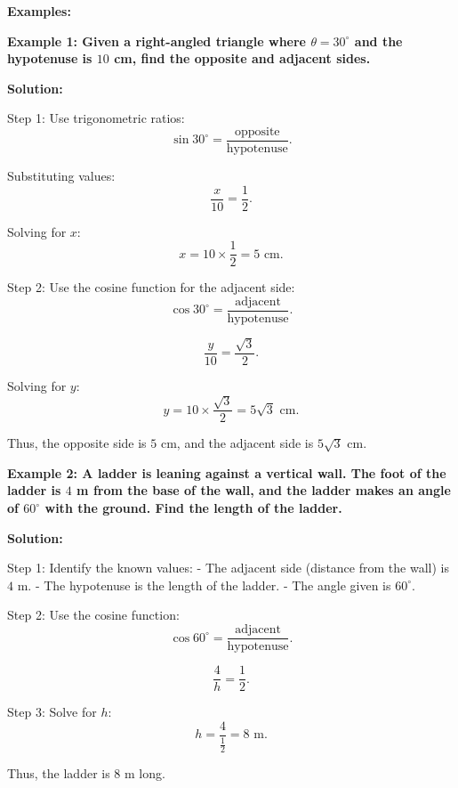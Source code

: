 \textbf{Examples:}

\begin{flushleft}
	\textbf{Example 1: Given a right-angled triangle where $\theta = 30^\circ$ and the hypotenuse is $10$ cm, find the opposite and adjacent sides.}
	
	\vspace{0.5cm}
	\textbf{Solution:}
	\vspace{0.5cm}
	
	Step 1: Use trigonometric ratios:
	\[
	\sin 30^\circ = \frac{\text{opposite}}{\text{hypotenuse}}.
	\]
	
	Substituting values:
	\[
	\frac{x}{10} = \frac{1}{2}.
	\]
	
	Solving for $x$:
	\[
	x = 10 \times \frac{1}{2} = 5 \text{ cm}.
	\]
	
	Step 2: Use the cosine function for the adjacent side:
	\[
	\cos 30^\circ = \frac{\text{adjacent}}{\text{hypotenuse}}.
	\]
	
	\[
	\frac{y}{10} = \frac{\sqrt{3}}{2}.
	\]
	
	Solving for $y$:
	\[
	y = 10 \times \frac{\sqrt{3}}{2} = 5\sqrt{3} \text{ cm}.
	\]
	
	Thus, the opposite side is $5$ cm, and the adjacent side is $5\sqrt{3}$ cm.
\end{flushleft}

\begin{flushleft}
	\textbf{Example 2: A ladder is leaning against a vertical wall. The foot of the ladder is $4$ m from the base of the wall, and the ladder makes an angle of $60^\circ$ with the ground. Find the length of the ladder.}
	
	\vspace{0.5cm}
	\textbf{Solution:}
	\vspace{0.5cm}
	
	Step 1: Identify the known values:
	- The adjacent side (distance from the wall) is $4$ m.
	- The hypotenuse is the length of the ladder.
	- The angle given is $60^\circ$.
	
	Step 2: Use the cosine function:
	\[
	\cos 60^\circ = \frac{\text{adjacent}}{\text{hypotenuse}}.
	\]
	
	\[
	\frac{4}{h} = \frac{1}{2}.
	\]
	
	Step 3: Solve for $h$:
	\[
	h = \frac{4}{\frac{1}{2}} = 8 \text{ m}.
	\]
	
	Thus, the ladder is $8$ m long.
\end{flushleft}

